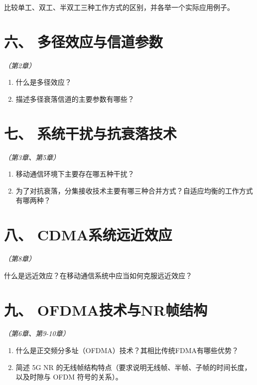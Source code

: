 \documentclass[12pt, a4paper]{ctexart}
\begin{document}
比较单工、双工、半双工三种工作方式的区别，并各举一个实际应用例子。

\vfill
\newpage

\section*{六、 多径效应与信道参数}
\textit{（第2章）}

\begin{enumerate}[label=(\arabic*)]
    \item 什么是多径效应？
    \item 描述多径衰落信道的主要参数有哪些？
\end{enumerate}

\vfill

\section*{七、 系统干扰与抗衰落技术}
\textit{（第3章、第5章）}

\begin{enumerate}[label=(\arabic*)]
    \item 移动通信环境下主要存在哪五种干扰？
    \item 为了对抗衰落，分集接收技术主要有哪三种合并方式？自适应均衡的工作方式有哪两种？
\end{enumerate}

\vfill
\newpage

\section*{八、 CDMA系统远近效应}
\textit{（第8章）}

什么是远近效应？在移动通信系统中应当如何克服远近效应？

\vfill

\section*{九、 OFDMA技术与NR帧结构}
\textit{（第6章、第9-10章）}

\begin{enumerate}[label=(\arabic*)]
    \item 什么是正交频分多址（OFDMA）技术？其相比传统FDMA有哪些优势？
    \item 简述 5G NR 的无线帧结构特点（要求说明无线帧、半帧、子帧的时间长度，以及时隙与 OFDM 符号的关系）。
\end{enumerate}

\vfill
\newpage
\end{document}
